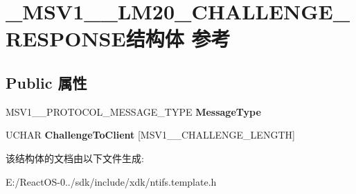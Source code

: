 \hypertarget{struct___m_s_v1__0___l_m20___c_h_a_l_l_e_n_g_e___r_e_s_p_o_n_s_e}{}\section{\+\_\+\+M\+S\+V1\+\_\+\_\+\+L\+M20\+\_\+\+C\+H\+A\+L\+L\+E\+N\+G\+E\+\_\+\+R\+E\+S\+P\+O\+N\+S\+E结构体 参考}
\label{struct___m_s_v1__0___l_m20___c_h_a_l_l_e_n_g_e___r_e_s_p_o_n_s_e}
\subsection*{Public 属性}
\begin{DoxyCompactItemize}
\item 
\mbox{\label{struct___m_s_v1__0___l_m20___c_h_a_l_l_e_n_g_e___r_e_s_p_o_n_s_e_a0388756200dce8bd27c38fb14ebbe729}} 
M\+S\+V1\+\_\+\_\+\+P\+R\+O\+T\+O\+C\+O\+L\+\_\+\+M\+E\+S\+S\+A\+G\+E\+\_\+\+T\+Y\+PE {\bfseries Message\+Type}
\item 
\mbox{\label{struct___m_s_v1__0___l_m20___c_h_a_l_l_e_n_g_e___r_e_s_p_o_n_s_e_a6f370f08471e7e76ea44c9c768d21cb1}} 
U\+C\+H\+AR {\bfseries Challenge\+To\+Client} \mbox{[}M\+S\+V1\+\_\+\_\+\+C\+H\+A\+L\+L\+E\+N\+G\+E\+\_\+\+L\+E\+N\+G\+TH\mbox{]}
\end{DoxyCompactItemize}


该结构体的文档由以下文件生成\+:\begin{DoxyCompactItemize}
\item 
E\+:/\+React\+O\+S-\/0../sdk/include/xdk/ntifs.\+template.\+h\end{DoxyCompactItemize}
